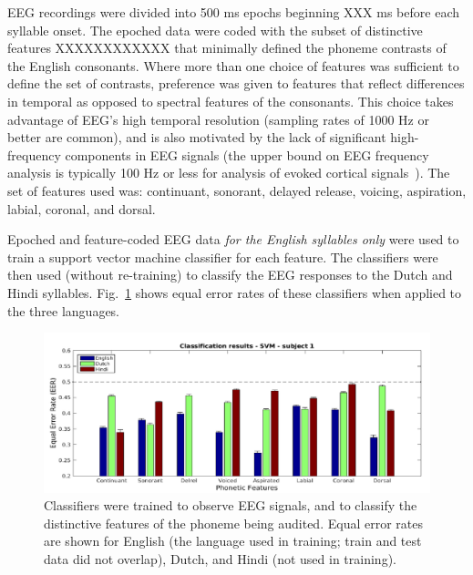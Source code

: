 EEG recordings were divided into 500 ms epochs beginning XXX ms before
each syllable onset.
The epoched data were coded with the subset of distinctive features XXXXXXXXXXXX
that minimally defined the phoneme contrasts of the English consonants.
Where more than one choice of features was sufficient to define the set
of contrasts, preference was given to features that reflect differences
in temporal as opposed to spectral features of the consonants. This
choice takes advantage of EEG's high temporal resolution (sampling
rates of 1000 Hz or better are common), and is also motivated by the
lack of significant high-frequency components in EEG signals (the upper
bound on EEG frequency analysis is typically 100 Hz or less for analysis
of evoked cortical signals~\cite{Luck05}). The set of features used was:
continuant, sonorant, delayed release, voicing, aspiration, labial,
coronal, and dorsal.

Epoched and feature-coded EEG data {\em for the English syllables only}
were used to train a support vector machine classifier for each feature.
The classifiers were then used (without re-training) to classify the
EEG responses to the Dutch and Hindi syllables.
Fig.~\ref{fig:eeg_svm_eers} shows equal error rates of these
classifiers when applied to the three languages.

\begin{figure}
  \centerline{\includegraphics[width=5in]{../figs/diliberto_svmresults.png}}
  \caption{Classifiers were trained to observe EEG signals, and to
    classify the distinctive features of the phoneme being audited.
    Equal error rates are shown for English (the language used in
    training; train and test data did not overlap), Dutch, and Hindi
    (not used in training).}
  \label{fig:eeg_svm_eers}
\end{figure}

